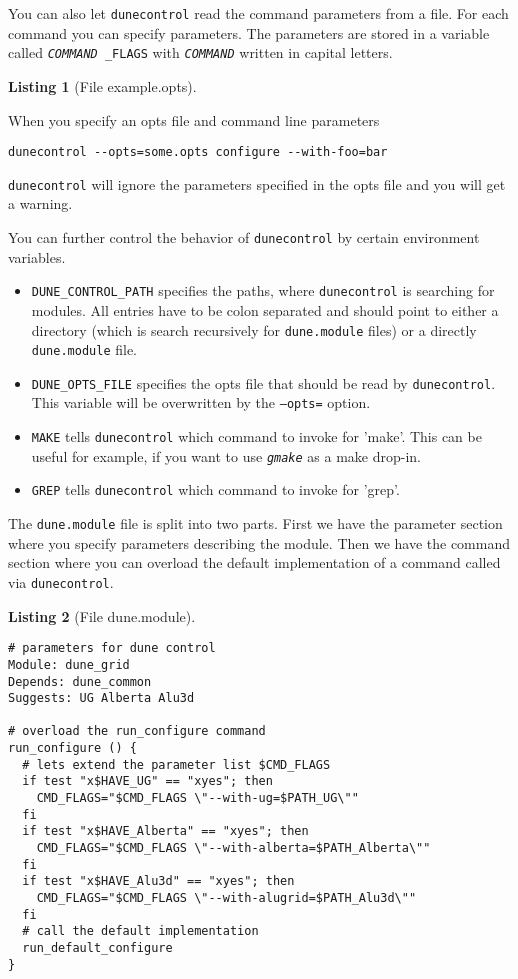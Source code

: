 \documentclass[11pt,a4paper,headinclude,footinclude,DIV16,normalheadings]{scrartcl}
\newtheorem{lst}{Listing}
\newcommand{\dunecontrol}{\texttt{dunecontrol}\xspace}
\newcommand{\dunemodule}{\texttt{dune.module}\xspace}
\begin{document}
You can also let \dunecontrol read the command parameters from a file.
For each command you can specify parameters. The parameters are stored
in a variable called \texttt{\textit{COMMAND}\,\_FLAGS} with
\texttt{\textit{COMMAND}} written in capital letters.

\begin{lst}[File example.opts] \mbox{}

\end{lst}

When you specify an opts file and command line parameters
\begin{lstlisting}
dunecontrol --opts=some.opts configure --with-foo=bar
\end{lstlisting}
\dunecontrol will ignore the parameters specified in the opts file and
you will get a warning.

You can further control the behavior of \dunecontrol by certain
environment variables.
\begin{itemize}
\item \texttt{DUNE\_CONTROL\_PATH} specifies the paths, where
  \dunecontrol is searching for modules. All entries have to be colon
  separated and should point to either a directory (which is search
  recursively for \texttt{dune.module} files) or a directly
  \texttt{dune.module} file.
\item \texttt{DUNE\_OPTS\_FILE} specifies the opts file that should be
  read by \dunecontrol. This variable will be overwritten by the
  \texttt{--opts=} option.
\item \texttt{MAKE} tells \dunecontrol which command to invoke for
  'make'. This can be useful for example, if you want to use
  \texttt{\textit{gmake}} as a make drop-in.
\item \texttt{GREP} tells \dunecontrol which command to invoke for 'grep'.
\end{itemize}


The \dunemodule file is split into two parts. First we have the
parameter section where you specify parameters describing the module.
Then we have the command section where you can overload the default
implementation of a command called via \dunecontrol.

\begin{lst}[File dune.module] \mbox{}
\begin{lstlisting}
# parameters for dune control
Module: dune_grid
Depends: dune_common
Suggests: UG Alberta Alu3d

# overload the run_configure command
run_configure () {
  # lets extend the parameter list $CMD_FLAGS
  if test "x$HAVE_UG" == "xyes"; then
    CMD_FLAGS="$CMD_FLAGS \"--with-ug=$PATH_UG\""
  fi
  if test "x$HAVE_Alberta" == "xyes"; then
    CMD_FLAGS="$CMD_FLAGS \"--with-alberta=$PATH_Alberta\""
  fi  
  if test "x$HAVE_Alu3d" == "xyes"; then
    CMD_FLAGS="$CMD_FLAGS \"--with-alugrid=$PATH_Alu3d\""
  fi
  # call the default implementation
  run_default_configure
}
\end{lstlisting}
\end{lst}
\end{document}
